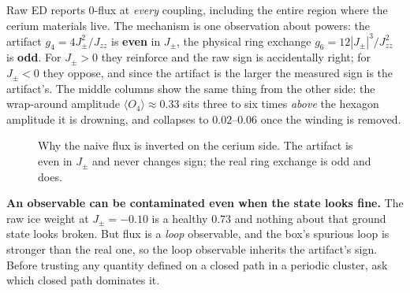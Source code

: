 \documentclass[11pt,a4paper]{article}
\newcommand{\Jpm}{J_{\pm}}
\newcommand{\Jzz}{J_{zz}}
\newcommand{\gfour}{g_4}
\newcommand{\gsix}{g_6}
\newcommand{\Ofour}{O_{4}}
\begin{document}
Raw ED reports $0$-flux at \emph{every} coupling, including the entire
region where the cerium materials live.  The mechanism is one observation
about powers: the artifact $\gfour=4\Jpm^2/\Jzz$ is \textbf{even} in
$\Jpm$, the physical ring exchange $\gsix=12|\Jpm|^3/\Jzz^2$ is
\textbf{odd}.  For $\Jpm>0$ they reinforce and the raw sign is accidentally
right; for $\Jpm<0$ they oppose, and since the artifact is the larger the
measured sign is the artifact's.  The middle columns show the same thing
from the other side: the wrap-around amplitude $\langle\Ofour\rangle\approx
0.33$ sits three to six times \emph{above} the hexagon amplitude it is
drowning, and collapses to $0.02$--$0.06$ once the winding is removed.

\begin{figure}[h]
\centering
{}
\caption{Why the naive flux is inverted on the cerium side.  The artifact is
even in $\Jpm$ and never changes sign; the real ring exchange is odd and
does.}
\label{fig:evenodd}
\end{figure}

\begin{lesson}
\textbf{An observable can be contaminated even when the state looks fine.}
The raw ice weight at $\Jpm=-0.10$ is a healthy $0.73$ and nothing about
that ground state looks broken.  But flux is a \emph{loop} observable, and
the box's spurious loop is stronger than the real one, so the loop
observable inherits the artifact's sign.  Before trusting any quantity
defined on a closed path in a periodic cluster, ask which closed path
dominates it.
\end{lesson}
\end{document}
